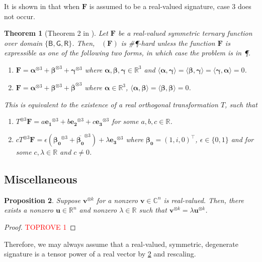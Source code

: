\documentclass[11pt]{article}
\newtheorem{theorem}{Theorem}[section]
\newtheorem{proposition}[theorem]{Proposition}
\DeclareMathOperator{\holts}{Holant^*_3}
\newcommand{\db}{\mathsf{B}}
\newcommand{\dg}{\mathsf{G}}
\newcommand{\dr}{\mathsf{R}}
\newcommand{\teh}{^{\otimes 3}}
\newcommand{\transpose}{^\intercal}
\newcommand{\ternarytractgeneq}{$\mathfrak{A}$\xspace}
\newcommand{\ternarytractz}{$\mathfrak{B}$\xspace}
\begin{document}
It is shown in \cite{liu_restricted_nodate} that when $\mathbf{F}$ is assumed to be a real-valued signature, case 3 does not occur.
\begin{theorem}[Theorem 2 in \cite{liu_restricted_nodate}]
  \label{thm:dich-single-sym-ter-dom3-real}
  Let $\mathbf{F}$ be a real-valued symmetric ternary function over domain $\{\db, \dg, \dr\}$. 
  Then, $\holts(\mathbf{F})$ is \#\P-hard unless the function $\mathbf{F}$ is expressible as one of the following two forms, in which case the problem is in \P.
  \begin{enumerate}
\item[\ternarytractgeneq.] \label{ternary-tract-geneq}
      $\mathbf{F} = \boldsymbol{\alpha} \teh + \boldsymbol{\beta} \teh + \boldsymbol{\gamma}\teh$ 
      where $\boldsymbol{\alpha}, \boldsymbol{\beta}, \boldsymbol{\gamma} \in \mathbb{R}^3$ 
      and $\langle \boldsymbol{\alpha}, \boldsymbol{\gamma} \rangle = \langle \boldsymbol{\beta}, \boldsymbol{\gamma} \rangle = \langle \boldsymbol{\gamma}, \boldsymbol{\alpha} \rangle = 0$.
    \item[\ternarytractz.] \label{ternary-tract-Z}
      $\mathbf{F} = \boldsymbol{\alpha} \teh + \boldsymbol{\beta} \teh + \overline{\boldsymbol{\beta}}\teh$ where $\boldsymbol{\alpha} \in \mathbb{R}^3$, $\langle \boldsymbol{\alpha}, \boldsymbol{\beta} \rangle = \langle \boldsymbol{\beta}, \boldsymbol{\beta} \rangle = 0$.
  \end{enumerate}
  This is equivalent to the existence of a real orthogonal transformation $T$, such that 
  \begin{enumerate}
\item[\ternarytractgeneq.] $T\teh \mathbf{F} = a \mathbf{e_1}\teh + b \mathbf{e_2} \teh + c \mathbf{e_3}\teh$ for some $a, b, c \in \mathbb{R}$.
    \item[\ternarytractz.] $c T\teh \mathbf{F}  = \epsilon(\boldsymbol{\beta_0}\teh + \overline{\boldsymbol{\beta_0}}\teh) + \lambda \mathbf{e_3}\teh$ where $\boldsymbol{\beta_0} = (1, i, 0)\transpose$, $\epsilon \in \{0, 1\}$ and for some $c, \lambda \in \mathbb{R}$ and $c \ne 0$.
  \end{enumerate}
\end{theorem}

\subsection{Miscellaneous}
\begin{proposition}\label{prop:real-degenerate-real-vector}
  Suppose $\mathbf{v}^{\otimes k}$ for a nonzero $\mathbf{v} \in \mathbb{C}^n$ is real-valued.
  Then, there exists a nonzero $\mathbf{u} \in \mathbb{R}^n$ and nonzero $\lambda \in \mathbb{R}$ such that $\mathbf{v}^{\otimes k} = \lambda \mathbf{u}^{\otimes k}$.
\end{proposition}
\begin{proof}\textcolor{red}{TOPROVE 1}\end{proof}
Therefore, we may always assume that a real-valued, symmetric, degenerate signature is a tensor power of a real vector by \cref{prop:real-degenerate-real-vector} and rescaling.
\end{document}
